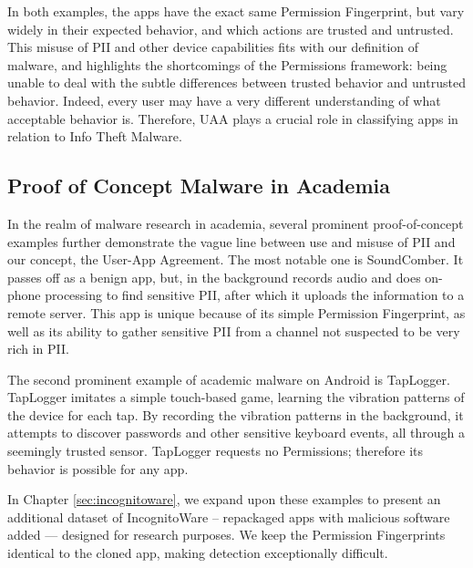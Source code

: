 \documentclass{acm_proc_article-sp}
\begin{document}
In both examples, the apps have the exact same Permission Fingerprint, but vary widely in their expected behavior, and which actions are trusted and untrusted. This misuse of PII and other device capabilities fits with our definition of malware, and highlights the shortcomings of the Permissions framework: being unable to deal with the subtle differences between trusted behavior and untrusted behavior. Indeed, every user may have a very different understanding of what acceptable behavior is. Therefore, UAA plays a crucial role in classifying apps in relation to Info Theft Malware.

\subsection{Proof of Concept Malware in Academia}
In the realm of malware research in academia, several prominent proof-of-concept examples further demonstrate the vague line between use and misuse of PII and our concept, the User-App Agreement. The most notable one is SoundComber\citep{schlegel2011soundcomber}. It passes off as a benign app, but, in the background records audio and does on-phone processing to find sensitive PII, after which it uploads the information to a remote server. This app is unique because of its simple Permission Fingerprint, as well as its ability to gather sensitive PII from a channel not suspected to be very rich in PII.

The second prominent example of academic malware on Android is TapLogger\citep{xu2012taplogger}. TapLogger imitates a simple touch-based game, learning the vibration patterns of the device for each tap. By recording the vibration patterns in the background, it attempts to discover passwords and other sensitive keyboard events, all through a seemingly trusted sensor. TapLogger requests no Permissions; therefore its behavior is possible for any app. 

In Chapter \ref{sec:incognitoware}, we expand upon these examples to present an additional dataset of IncognitoWare -- repackaged apps with malicious software added --- designed for research purposes. We keep the Permission Fingerprints identical to the cloned app, making detection exceptionally difficult. 
\end{document}
